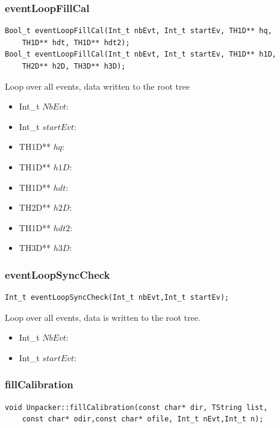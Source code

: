 \documentclass[a4paper]{book}
\begin{document}
\subsubsection{eventLoopFillCal}

\begin{lstlisting}
Bool_t eventLoopFillCal(Int_t nbEvt, Int_t startEv, TH1D** hq, 
	TH1D** hdt, TH1D** hdt2);
Bool_t eventLoopFillCal(Int_t nbEvt, Int_t startEv, TH1D** h1D, 
	TH2D** h2D, TH3D** h3D);
\end{lstlisting}

Loop over all events, data written to the root tree

\begin{itemize}
	\item Int\_t $NbEvt$: 
	\item Int\_t $startEvt$: 
	\item TH1D** $hq$: 
	\item TH1D** $h1D$: 
	\item TH1D** $hdt$: 
	\item TH2D** $h2D$: 
	\item TH1D** $hdt2$: 
	\item TH3D** $h3D$: 
\end{itemize}

\subsubsection{eventLoopSyncCheck}

\begin{lstlisting}
Int_t eventLoopSyncCheck(Int_t nbEvt,Int_t startEv);
\end{lstlisting}

Loop over all events, data is written to the root tree.

\begin{itemize}
	\item Int\_t $NbEvt$: 
	\item Int\_t $startEvt$: 
\end{itemize}

\subsubsection{fillCalibration}

\begin{lstlisting}
void Unpacker::fillCalibration(const char* dir, TString list,
	const char* odir,const char* ofile, Int_t nEvt,Int_t n);
\end{lstlisting}
\end{document}
